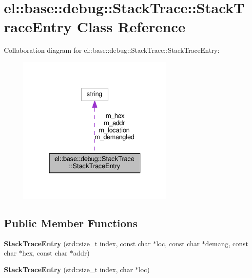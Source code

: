 \hypertarget{classel_1_1base_1_1debug_1_1_stack_trace_1_1_stack_trace_entry}{}\section{el\+:\+:base\+:\+:debug\+:\+:Stack\+Trace\+:\+:Stack\+Trace\+Entry Class Reference}
\label{classel_1_1base_1_1debug_1_1_stack_trace_1_1_stack_trace_entry}


Collaboration diagram for el\+:\+:base\+:\+:debug\+:\+:Stack\+Trace\+:\+:Stack\+Trace\+Entry\+:\nopagebreak
\begin{figure}[H]
\begin{center}
\leavevmode
\includegraphics[width=220pt]{classel_1_1base_1_1debug_1_1_stack_trace_1_1_stack_trace_entry__coll__graph}
\end{center}
\end{figure}
\subsection*{Public Member Functions}
\begin{DoxyCompactItemize}
\item 
\mbox{\label{classel_1_1base_1_1debug_1_1_stack_trace_1_1_stack_trace_entry_a49b21719794ee5de7f70e2558ebcba9e}} 
{\bfseries Stack\+Trace\+Entry} (std\+::size\+\_\+t index, const char $\ast$loc, const char $\ast$demang, const char $\ast$hex, const char $\ast$addr)
\item 
\mbox{\label{classel_1_1base_1_1debug_1_1_stack_trace_1_1_stack_trace_entry_a9fbf0675fe713b1ac4ec692bbe661afe}} 
{\bfseries Stack\+Trace\+Entry} (std\+::size\+\_\+t index, char $\ast$loc)
\end{DoxyCompactItemize}
